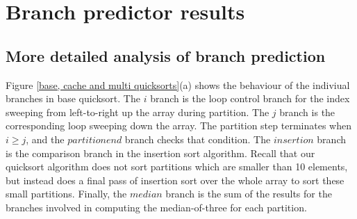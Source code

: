 \section{Branch predictor results}

\subsection{More detailed analysis of branch prediction}





Figure \ref{base, cache and multi quicksorts}(a) shows the behaviour
of the indiviual branches in base quicksort. The $i$ branch is the
loop control branch for the index sweeping from left-to-right up the
array during partition. The $j$ branch is the corresponding loop
sweeping down the array. The partition step terminates when $i \geq
j$, and the $partition end$ branch checks that condition. The
$insertion$ branch is the comparison branch in the insertion sort
algorithm. Recall that our quicksort algorithm does not sort
partitions which are smaller than 10 elements, but instead does a
final pass of insertion sort over the whole array to sort these small
partitions. Finally, the $median$ branch is the sum of the results for
the branches involved in computing the median-of-three for each
partition.


